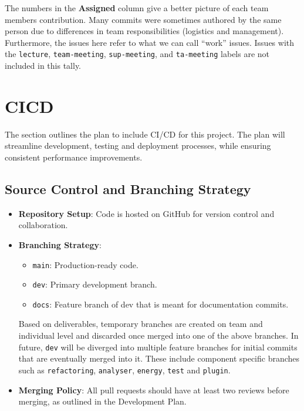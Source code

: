 \documentclass{article}
\begin{document}
The numbers in the \textbf{Assigned} column give a better picture of each team members contribution. Many commits were sometimes authored by the same person due to differences in team responsibilities (logistics and management). Furthermore, the issues here refer to what we can call ``work'' issues. Issues with the \texttt{lecture}, \texttt{team-meeting}, \texttt{sup-meeting}, and \texttt{ta-meeting} labels are not included in this tally.

\section{CICD}

The section outlines the plan to include CI/CD for this project. The plan will streamline development, testing and deployment processes, while ensuring consistent performance improvements.

\subsection{Source Control and Branching Strategy}
\begin{itemize}
    \item \textbf{Repository Setup}: Code is hosted on GitHub for version control and collaboration.
    \item \textbf{Branching Strategy}:
    \begin{itemize}
        \item \texttt{main}: Production-ready code.
        \item \texttt{dev}: Primary development branch.
        \item \texttt{docs}: Feature branch of dev that is meant for documentation commits.
    \end{itemize}
    Based on deliverables, temporary branches are created on team and individual level and discarded once merged into one of the above branches.
    In future, \texttt{dev} will be diverged into multiple feature branches for initial commits that are eventually merged into it. These include component specific branches such as \texttt{refactoring}, \texttt{analyser}, \texttt{energy}, \texttt{test} and \texttt{plugin}.
    \item \textbf{Merging Policy}: All pull requests should have at least two reviews before merging, as outlined in the Development Plan.
\end{itemize}
\end{document}
